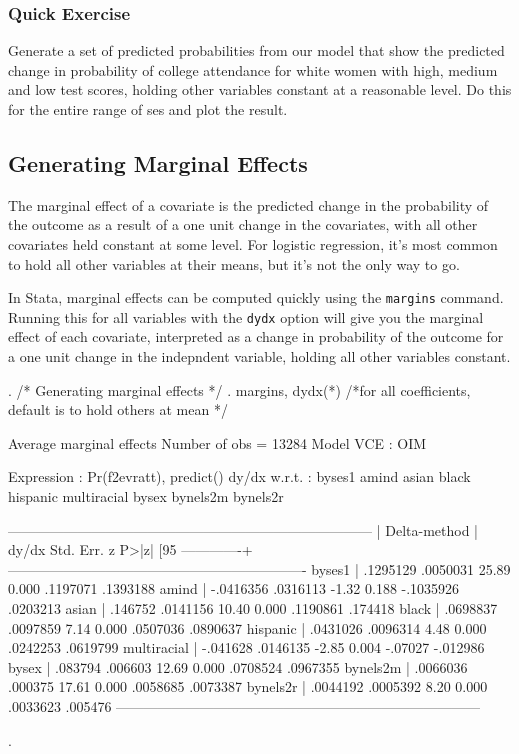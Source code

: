 \documentclass[12pt]{article}
\begin{document}
\subsubsection{Quick Exercise}

Generate a set of predicted probabilities from our model that show the
predicted change in probability of college attendance for white women
with high, medium and low test scores, holding
other variables constant at a reasonable level. Do this
for the entire range of ses and plot the result. 




\subsection{Generating Marginal Effects}

The marginal effect of a covariate is the predicted change in the
probability of the outcome as a result of a one unit change in the
covariates, with all other covariates held constant at some level. For
logistic regression, it's most common to hold all other variables at
their means, but it's not the only way to go. 

In Stata, marginal effects can be computed quickly using the
\texttt{margins} command. Running this for all variables with the
\texttt{dydx} option will give you the marginal effect of each
covariate, interpreted as a change in probability of the outcome for a
one unit change in the indepndent variable, holding all other
variables constant. 


\begin{stlog}
. /* Generating marginal effects */
. margins, dydx(*) /*for all coefficients, default is to hold others at mean */  

Average marginal effects                          Number of obs   =      13284
Model VCE    : OIM

Expression   : Pr(f2evratt), predict()
dy/dx w.r.t. : byses1 amind asian black hispanic multiracial bysex bynels2m bynels2r

------------------------------------------------------------------------------
             |            Delta-method
             |      dy/dx   Std. Err.      z    P>|z|     [95%
-------------+----------------------------------------------------------------
      byses1 |   .1295129   .0050031    25.89   0.000     .1197071    .1393188
       amind |  -.0416356   .0316113    -1.32   0.188    -.1035926    .0203213
       asian |    .146752   .0141156    10.40   0.000     .1190861     .174418
       black |   .0698837   .0097859     7.14   0.000     .0507036    .0890637
    hispanic |   .0431026   .0096314     4.48   0.000     .0242253    .0619799
 multiracial |   -.041628   .0146135    -2.85   0.004      -.07027    -.012986
       bysex |    .083794    .006603    12.69   0.000     .0708524    .0967355
    bynels2m |   .0066036    .000375    17.61   0.000     .0058685    .0073387
    bynels2r |   .0044192   .0005392     8.20   0.000     .0033623     .005476
------------------------------------------------------------------------------

. 
\end{stlog}
\end{document}
